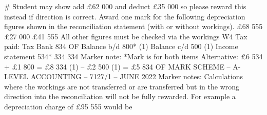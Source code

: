 \documentclass{article}
\begin{document}
\# Student may show add £62 000 and deduct £35 000 so please reward this instead if direction is \newline
correct. \newline
 \newline
Award one mark for the following depreciation figures shown in the reconciliation statement (with or \newline
without workings).   \newline
£68 555 \newline
£27 000 \newline
£41 555 \newline
 \newline
All other figures must be checked via the workings \newline
 \newline
W4 Tax paid: \newline
Tax \newline
Bank  834 OF  Balance b/d  800* (1) \newline
Balance c/d  500 (1) Income statement  534* \newline
  334   334 \newline
 \newline
Marker note:  \newline
 \newline
*Mark is for both items  \newline
 \newline
Alternative: \newline
£6 534 + £1 800 = £8 334 (1) – £2 500 (1) = £5 834 OF \newline
 \newline
 \newline
 \newline
MARK SCHEME – A-LEVEL ACCOUNTING – 7127/1 – JUNE 2022  \newline
Marker notes: \newline
 \newline
Calculations where the workings are not transferred or are transferred but in the wrong direction into the \newline
reconciliation will not be fully rewarded. For example a depreciation charge of £95 555 would be \newline
\end{document}
